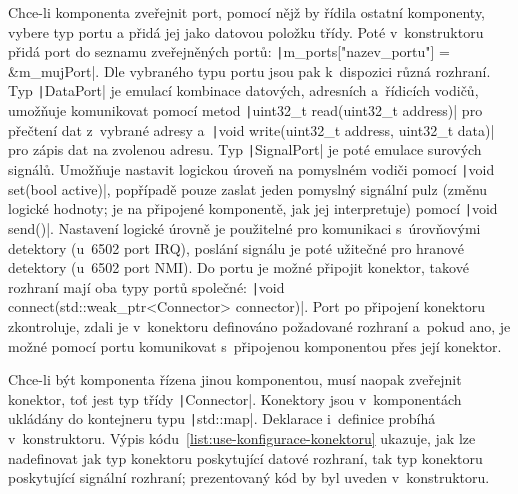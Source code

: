 Chce-li komponenta zveřejnit port, pomocí nějž by řídila ostatní komponenty, vybere typ portu a přidá jej jako datovou položku třídy. Poté v~konstruktoru přidá port do seznamu zveřejněných portů: \texttt|m_ports["nazev_portu"] = &m_mujPort|. Dle vybraného typu portu jsou pak k~dispozici různá rozhraní. Typ \texttt|DataPort| je emulací kombinace datových, adresních a~řídicích vodičů, umožňuje komunikovat pomocí metod \texttt|uint32_t read(uint32_t address)| pro přečtení dat z~vybrané adresy a~\texttt|void write(uint32_t address, uint32_t data)| pro zápis dat na zvolenou adresu. Typ \texttt|SignalPort| je poté emulace surových signálů. Umožňuje nastavit logickou úroveň na pomyslném vodiči pomocí \texttt|void set(bool active)|, popřípadě pouze zaslat jeden pomyslný signální pulz (změnu logické hodnoty; je na připojené komponentě, jak jej interpretuje) pomocí \texttt|void send()|. Nastavení logické úrovně je použitelné pro komunikaci s~úrovňovými detektory (u~6502 port IRQ), poslání signálu je poté užitečné pro hranové detektory (u~6502 port NMI).  Do portu je možné připojit konektor, takové rozhraní mají oba typy portů společné: \texttt|void connect(std::weak_ptr<Connector> connector)|. Port po připojení konektoru zkontroluje, zdali je v~konektoru definováno požadované rozhraní a~pokud ano, je možné pomocí portu komunikovat s~připojenou komponentou přes její konektor.

Chce-li být komponenta řízena jinou komponentou, musí naopak zveřejnit konektor, toť jest typ třídy \texttt|Connector|.  Konektory jsou v~komponentách ukládány do kontejneru typu \texttt|std::map|. Deklarace i~definice probíhá v~konstruktoru. Výpis kódu~\ref{list:use-konfigurace-konektoru} ukazuje, jak lze nadefinovat jak typ konektoru poskytující datové rozhraní, tak typ konektoru poskytující signální rozhraní; prezentovaný kód by byl uveden v~konstruktoru.

